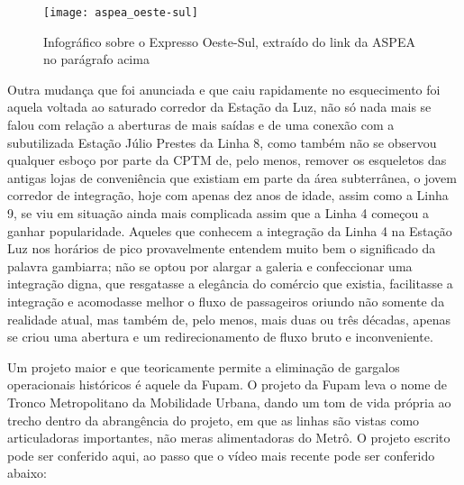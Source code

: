 \documentclass[11pt,fleqn]{book} %
\begin{document}
\begin{figure}[htb]
	\caption[Diagrama do Expresso Oeste-Sul]{Infográfico sobre o Expresso Oeste-Sul, extraído do link da ASPEA no parágrafo acima}
	\centering
	\texttt{[image: aspea\_oeste-sul]}
	\label{fig:aspea_oeste-sul}
\end{figure}

Outra mudança que foi anunciada e que caiu rapidamente no esquecimento foi aquela voltada ao saturado corredor da Estação da Luz, não só nada mais se falou com relação a aberturas de mais saídas e de uma conexão com a subutilizada Estação Júlio Prestes da Linha 8, como também não se observou qualquer esboço por parte da CPTM de, pelo menos, remover os esqueletos das antigas lojas de conveniência que existiam em parte da área subterrânea, o jovem corredor de integração, hoje com apenas dez anos de idade, assim como a Linha 9, se viu em situação ainda mais complicada assim que a Linha 4 começou a ganhar popularidade. Aqueles que conhecem a integração da Linha 4 na Estação Luz nos horários de pico provavelmente entendem muito bem o significado da palavra gambiarra; não se optou por alargar a galeria e confeccionar uma integração digna, que resgatasse a elegância do comércio que existia, facilitasse a integração e acomodasse melhor o fluxo de passageiros oriundo não somente da realidade atual, mas também de, pelo menos, mais duas ou três décadas, apenas se criou uma abertura e um redirecionamento de fluxo bruto e inconveniente.

Um projeto maior e que teoricamente permite a eliminação de gargalos operacionais históricos é aquele da Fupam. O projeto da Fupam leva o nome de Tronco Metropolitano da Mobilidade Urbana, dando um tom de vida própria ao trecho dentro da abrangência do projeto, em que as linhas são vistas como articuladoras importantes, não meras alimentadoras do Metrô. O projeto escrito pode ser conferido aqui, ao passo que o vídeo mais recente pode ser conferido abaixo:

\end{document}
